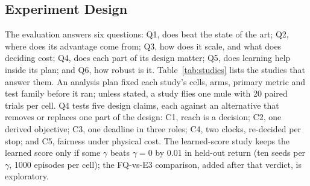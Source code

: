 \subsection{Experiment Design}
\label{sec:setup:design}

The evaluation answers six questions: Q1, does \sysname{} beat the state of the
art; Q2, where does its advantage come from; Q3, how does it scale, and what does
deciding cost; Q4, does each part of its design matter; Q5, does learning help
inside its plan; and Q6, how robust is it. Table~\ref{tab:studies} lists the
studies that answer them. An analysis plan fixed each study's cells, arms,
primary metric and test family before it ran; unless stated, a study flies one
mule with 20 paired trials per cell. Q4 tests five design claims, each against an
alternative that removes or replaces one part of the design: C1, reach is a
decision; C2, one derived objective; C3, one deadline in three roles; C4, two
clocks, re-decided per stop; and C5, fairness under physical cost. The
learned-score study keeps the learned score only if some $\gamma$ beats
$\gamma=0$ by 0.01 in held-out return (ten seeds per $\gamma$, 1000 episodes per
cell); the FQ-vs-E3 comparison, added after that verdict, is exploratory.


